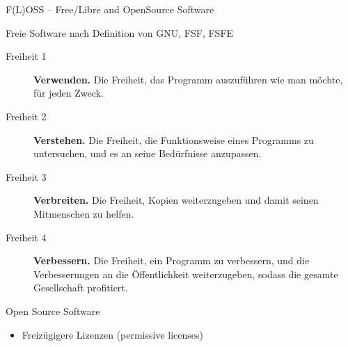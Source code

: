 \documentclass[t]{beamer}
\makeatletter
\newcommand{\strong}[1]{\@strong{#1}}
\newcommand{\@@strong}[1]{\textbf{\let\@strong\@@@strong#1}}
\newcommand{\@@@strong}[1]{\textnormal{\let\@strong\@@strong#1}}
\let\@strong\@@strong
\makeatother
\begin{document}
\begin{frame}{F(L)OSS -- Free/Libre and OpenSource Software}
    \begin{block}{Freie Software nach Definition von GNU, FSF, FSFE}
        \begin{description}
            \item[Freiheit 1] \strong{Verwenden.} {\small Die Freiheit,
                das Programm auszuführen wie man möchte, für jeden
                Zweck.}
            \item[Freiheit 2] \strong{Verstehen.} {\small Die Freiheit,
                die Funktionsweise eines Programms zu untersuchen, und
                es an seine Bedürfnisse anzupassen.}
            \item[Freiheit 3] \strong{Verbreiten.} {\small Die Freiheit,
                Kopien weiterzugeben und damit seinen Mitmenschen zu
                helfen.}
            \item[Freiheit 4] \strong{Verbessern.} {\small Die Freiheit,
                ein Programm zu verbessern, und die Verbesserungen
                an die Öffentlichkeit weiterzugeben, sodass die
                gesamte Gesellschaft profitiert.}
        \end{description}
    \end{block}
    \pause
    \begin{block}{Open Source Software}
        \begin{itemize}
            \item Freizügigere Lizenzen (permissive licenses)
        \end{itemize}
    \end{block}
\end{frame}
\end{document}
